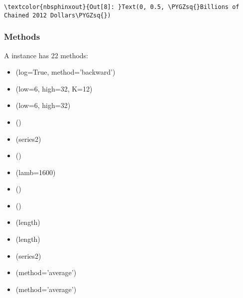 \documentclass[letterpaper,10pt,openany,oneside,english]{sphinxmanual}
\begin{document}
%
\begin{Verbatim}[commandchars=\\\{\}]
\textcolor{nbsphinxout}{Out[8]: }Text(0, 0.5, \PYGZsq{}Billions of Chained 2012 Dollars\PYGZsq{})
\end{Verbatim}

\noindent{}


\subsubsection{Methods}
\label{\detokenize{fredpy_examples:Methods}}
A {\hyperref[\detokenize{series_class:fredpy.series}]{}} instance has 22 methods:
\begin{itemize}
\item {} 
(log=True, method=’backward’)

\item {} 
(low=6, high=32, K=12)

\item {} 
(low=6, high=32)

\item {} 
()

\item {} 
(series2)

\item {} 
()

\item {} 
(lamb=1600)

\item {} 
()

\item {} 
()

\item {} 
(length)

\item {} 
(length)

\item {} 
(series2)

\item {} 
(method=’average’)

\item {} 
(method=’average’)


\end{itemize}
\end{document}
